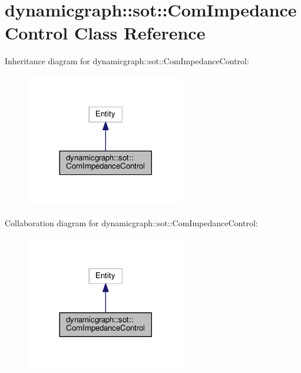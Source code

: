 \hypertarget{classdynamicgraph_1_1sot_1_1ComImpedanceControl}{}\section{dynamicgraph\+:\+:sot\+:\+:Com\+Impedance\+Control Class Reference}
\label{classdynamicgraph_1_1sot_1_1ComImpedanceControl}


Inheritance diagram for dynamicgraph\+:\+:sot\+:\+:Com\+Impedance\+Control\+:
\nopagebreak
\begin{figure}[H]
\begin{center}
\leavevmode
\includegraphics[width=197pt]{classdynamicgraph_1_1sot_1_1ComImpedanceControl__inherit__graph}
\end{center}
\end{figure}


Collaboration diagram for dynamicgraph\+:\+:sot\+:\+:Com\+Impedance\+Control\+:
\nopagebreak
\begin{figure}[H]
\begin{center}
\leavevmode
\includegraphics[width=197pt]{classdynamicgraph_1_1sot_1_1ComImpedanceControl__coll__graph}
\end{center}
\end{figure}
